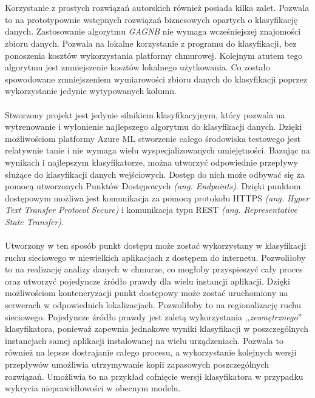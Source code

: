 \\ \\
Korzystanie z prostych rozwiązań autorskich również posiada kilka zalet. Pozwala to na prototypownie wstępnych rozwiązań biznesowych opartych o klasyfikację danych. Zastosowanie algorytmu \textit{GAGNB} nie wymaga wcześniejszej znajomości zbioru danych. Pozwala na lokalne korzystanie z programu do klasyfikacji, bez ponoszenia kosztów wykorzystania platformy chmurowej. Kolejnym atutem tego algorytmu jest zmniejszenie kosztów lokalnego użytkowania. Co zostało spowodowane zmniejszeniem wymiarowości zbioru danych do klasyfikacji poprzez wykorzystanie jedynie wytypowanych kolumn.
\\ \\
Stworzony projekt jest jedynie silnikiem klasyfikacyjnym, który pozwala na wytrenowanie i wyłonienie najlepszego algorytmu do klasyfikacji danych. Dzięki możliwościom platformy Azure ML stworzenie całego środowiska testowego jest relatywnie tanie i nie wymaga wielu wyspecjalizowanych umiejętności. Bazując na wynikach i najlepszym klasyfikatorze, można utworzyć odpowiednie przepływy służące do klasyfikacji danych wejściowych. Dostęp do nich może odbywać się za pomocą utworzonych Punktów Dostępowych \textit{(ang. Endpoints)}. Dzięki punktom dostępowym możliwa jest komunikacja za pomocą protokołu HTTPS \textit{(ang. Hyper Text Transfer Protocol Secure)} i komunikacja typu REST \textit{(ang. Representative State Transfer)}.
\\ \\
Utworzony w ten sposób punkt dostępu może zostać wykorzystany w klasyfikacji ruchu sieciowego w niewielkich aplikacjach z dostępem do internetu. Pozwoliłoby to na realizację analizy danych w chmurze, co mogłoby przyspieszyć cały proces oraz utworzyć pojedyncze źródło prawdy dla wielu instancji aplikacji. Dzięki możliwościom konteneryzacji punkt dostępowy może zostać uruchomiony na serwerach w odpowiednich lokalizacjach. Pozwoliłoby to na regionalizację ruchu sieciowego. Pojedyncze źródło prawdy jest zaletą wykorzystania ,,\textit{zewnętrznego}'' klasyfikatora, ponieważ zapewnia jednakowe wyniki klasyfikacji w poszczególnych instancjach samej aplikacji instalowanej na wielu urządzeniach. Pozwala to również na lepsze dostrajanie całego procesu, a wykorzystanie kolejnych wersji przepływów umożliwia utrzymywanie kopii zapasowych poszczególnych rozwiązań. Umożliwia to na przykład cofnięcie wersji klasyfikatora w przypadku wykrycia nieprawidłowości w obecnym modelu.
